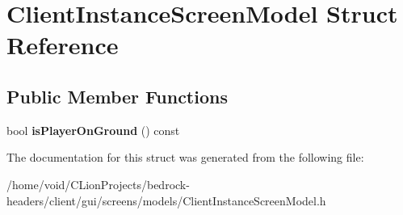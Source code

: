 \hypertarget{struct_client_instance_screen_model}{}\section{Client\+Instance\+Screen\+Model Struct Reference}
\label{struct_client_instance_screen_model}
\subsection*{Public Member Functions}
\begin{DoxyCompactItemize}
\item 
\mbox{\label{struct_client_instance_screen_model_a597eedd22d2fb5771297d535223ad7e8}} 
bool {\bfseries is\+Player\+On\+Ground} () const
\end{DoxyCompactItemize}


The documentation for this struct was generated from the following file\+:\begin{DoxyCompactItemize}
\item 
/home/void/\+C\+Lion\+Projects/bedrock-\/headers/client/gui/screens/models/Client\+Instance\+Screen\+Model.\+h\end{DoxyCompactItemize}
